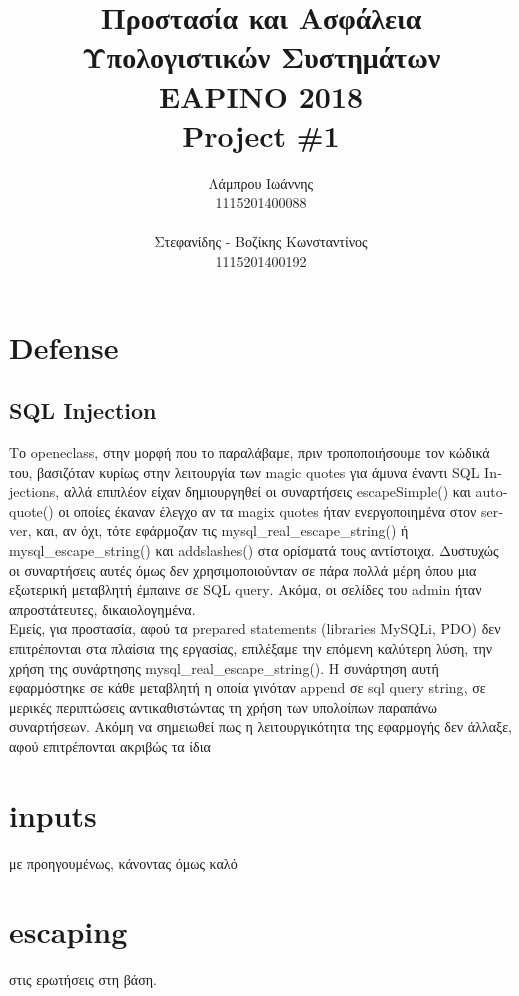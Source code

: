\documentclass{article}
\begin{document}
\title{\vspace{-3.5cm}\textbf{Προστασία και Ασφάλεια Υπολογιστικών Συστημάτων \\ΕΑΡΙΝΟ 2018\\ \textlatin{Project \#}1}}
\author{Λάμπρου Ιωάννης \\1115201400088\\\\ Στεφανίδης - Βοζίκης Κωνσταντίνος \\1115201400192}

\maketitle
\section*{\textlatin{Defense}}
\subsection*{\textlatin{SQL Injection}}
Το \textlatin{openeclass}, στην μορφή που το παραλάβαμε, πριν τροποποιήσουμε τον κώδικά του, 
βασιζόταν κυρίως στην λειτουργία των \textlatin{magic quotes} για άμυνα έναντι \textlatin{SQL Injections},
αλλά επιπλέον είχαν δημιουργηθεί οι συναρτήσεις \textlatin{escapeSimple()} και \textlatin{autoquote()} οι
οποίες έκαναν έλεγχο αν τα \textlatin{magix quotes} ήταν ενεργοποιημένα στον \textlatin{server}, και, αν
όχι, τότε εφάρμοζαν τις \textlatin{mysql\_real\_escape\_string()} ή \textlatin{mysql\_escape\_string()} και
\textlatin{addslashes()} στα ορίσματά τους αντίστοιχα. Δυστυχώς οι συναρτήσεις αυτές όμως δεν
χρησιμοποιούνταν σε πάρα πολλά μέρη όπου μια εξωτερική μεταβλητή
έμπαινε σε \textlatin{SQL query}. Ακόμα, οι σελίδες του \textlatin{admin} ήταν απροστάτευτες, δικαιολογημένα.\\
Εμείς, για προστασία, αφού τα \textlatin{prepared statements (libraries MySQLi, PDO)} δεν επιτρέπονται στα
πλαίσια της εργασίας, επιλέξαμε την επόμενη καλύτερη λύση, την χρήση της συνάρτησης
\textlatin{mysql\_real\_escape\_string()}.
Η συνάρτηση αυτή εφαρμόστηκε σε κάθε μεταβλητή η οποία γινόταν \textlatin{append}
σε \textlatin{sql query string}, σε μερικές περιπτώσεις αντικαθιστώντας τη χρήση των υπολοίπων παραπάνω
συναρτήσεων. Ακόμη να σημειωθεί πως η λειτουργικότητα της εφαρμογής δεν άλλαξε, αφού επιτρέπονται ακριβώς τα ίδια \section*{inputs} με προηγουμένως, κάνοντας όμως καλό \section*{escaping} στις ερωτήσεις στη βάση.
\end{document}

